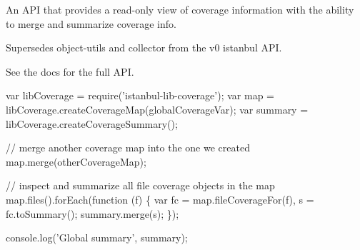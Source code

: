 \href{https://greenkeeper.io/}{\tt } \href{https://travis-ci.org/istanbuljs/istanbul-lib-coverage}{\tt }

An A\+PI that provides a read-\/only view of coverage information with the ability to merge and summarize coverage info.

Supersedes {\ttfamily object-\/utils} and {\ttfamily collector} from the v0 istanbul A\+PI.

See the docs for the full A\+PI.


\begin{DoxyCode}
var libCoverage = require('istanbul-lib-coverage');
var map = libCoverage.createCoverageMap(globalCoverageVar);
var summary = libCoverage.createCoverageSummary();

// merge another coverage map into the one we created
map.merge(otherCoverageMap);

// inspect and summarize all file coverage objects in the map
map.files().forEach(function (f) \{
    var fc = map.fileCoverageFor(f),
    s = fc.toSummary();
    summary.merge(s);
\});

console.log('Global summary', summary);
\end{DoxyCode}
 